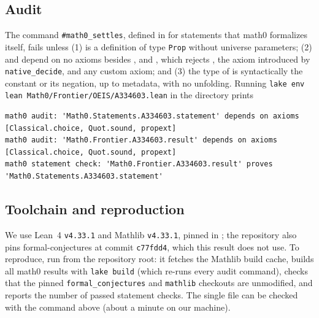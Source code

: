 \documentclass[11pt]{amsart}
\theoremstyle{plain}
\theoremstyle{definition}
\begin{document}
\subsection*{Audit}
The command \texttt{\#math0\_settles}, defined in  for statements that math0 formalizes itself, fails unless (1)  is a definition of type \texttt{Prop} without universe parameters; (2)  and  depend on no axioms besides ,  and , which rejects , the axiom  introduced by \texttt{native\_decide}, and any custom axiom; and (3) the type of  is syntactically the constant  or its negation, up to metadata, with no unfolding. Running \texttt{lake env lean Math0/Frontier/OEIS/A334603.lean} in the directory  prints
\begin{lstlisting}[basicstyle=\ttfamily\scriptsize]
math0 audit: 'Math0.Statements.A334603.statement' depends on axioms [Classical.choice, Quot.sound, propext]
math0 audit: 'Math0.Frontier.A334603.result' depends on axioms [Classical.choice, Quot.sound, propext]
math0 statement check: 'Math0.Frontier.A334603.result' proves 'Math0.Statements.A334603.statement'
\end{lstlisting}

\subsection*{Toolchain and reproduction}
We use Lean~4 \cite{Lean4} \texttt{v4.33.1} and Mathlib \cite{Mathlib} \texttt{v4.33.1}, pinned in ; the repository also pins formal-conjectures \cite{FC} at commit \texttt{c77fdd4}, which this result does not use.
To reproduce, run  from the repository root: it fetches the Mathlib build cache, builds all math0 results with \texttt{lake build} (which re-runs every audit command), checks that the pinned \texttt{formal\_conjectures} and \texttt{mathlib} checkouts are unmodified, and reports the number of passed statement checks.
The single file can be checked with the command above (about a minute on our machine).
\end{document}
